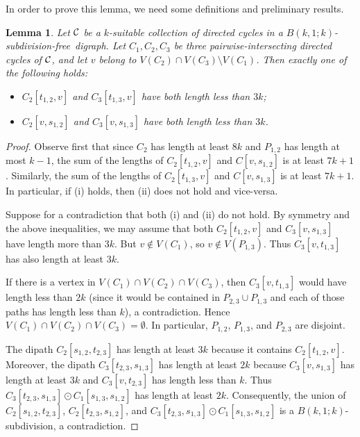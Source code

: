 \documentclass[utf8,10pt]{article}
\theoremstyle{plain}
\newtheorem{lemma}[theorem]{Lemma}
\theoremstyle{definition}
\theoremstyle{remark}
\newcommand{\free}{subdivision-free}
\begin{document}
 
 In order to prove this lemma, we need some definitions and preliminary results.

 
 \begin{lemma}\label{lem:dis}
 Let ${\cal C}$ be a $k$-suitable collection of directed cycles in a $B(k,1;k)$-\free\ digraph.
Let $C_1,C_2,C_3$ be three pairwise-intersecting directed cycles of ${\cal C}$, and let $v$ belong to $V(C_2)\cap V(C_3)\setminus V(C_1)$. 
Then exactly one of the following holds:
\begin{itemize}
\item[(i)] $C_2[t_{1,2}, v]$ and $C_3[t_{1,3}, v]$ have both length less than $3k$; 
\item[(ii)] $C_2[v, s_{1,2}]$ and $C_3[v, s_{1,3}]$ have both length less than $3k$.
\end{itemize}
\end{lemma}

\begin{proof}
Observe first that since $C_2$ has length at least $8k$ and $P_{1,2}$ has length at most $k-1$, the sum of the lengths of $C_2[t_{1,2}, v]$ and  $C[v, s_{1,2}]$ is at least $7k+1$. Similarly, the sum of the lengths of $C_2[t_{1,3}, v]$ and $C[v, s_{1,3}]$ is at least $7k+1$. In particular, if (i) holds, then (ii) does not hold and vice-versa.


Suppose for a contradiction that both (i) and (ii) do not hold. By symmetry and the above inequalities, we may assume that both $C_2[t_{1,2}, v]$ and $C_3[v, s_{1,3}]$ have length more than $3k$.
But $v\notin V(C_1)$, so $v\notin V(P_{1,3})$. Thus $C_3[v, t_{1,3}]$  has also length at least $3k$. 

If there is a vertex in $V(C_1)\cap V(C_2)\cap V(C_3)$, then $C_3[v,t_{1,3}]$ would have length less than $2k$ (since it would be contained in $P_{2,3}\cup P_{1,3}$ and each of those paths has length less than $k$), a contradiction.
Hence $V(C_1)\cap V(C_2)\cap V(C_3)=\emptyset$. In particular, $P_{1,2}$, $P_{1,3}$, and $P_{2,3}$ are disjoint.

The dipath  $C_2[s_{1,2}, t_{2,3}]$ has length at least $3k$ because it contains $C_2[t_{1,2},v]$. Moreover, the dipath $C_3[t_{2,3}, s_{1,3}]$ 
has length at least $2k$ because $C_3[v, s_{1,3}]$ has length at least $3k$ and $C_3[v,t_{2,3}]$ has length less than $k$.
Thus $C_3[t_{2,3}, s_{1,3}]\odot C_1[s_{1,3}, s_{1,2}]$ has length at least $2k$.
Consequently, the union of $C_2[s_{1,2}, t_{2,3}]$, $C_2[t_{2,3}, s_{1,2}]$, and $C_3[t_{2,3}, s_{1,3}]\odot C_1[s_{1,3}, s_{1,2}]$  is a $B(k,1;k)$-subdivision, a contradiction.
\end{proof}
\end{document}
